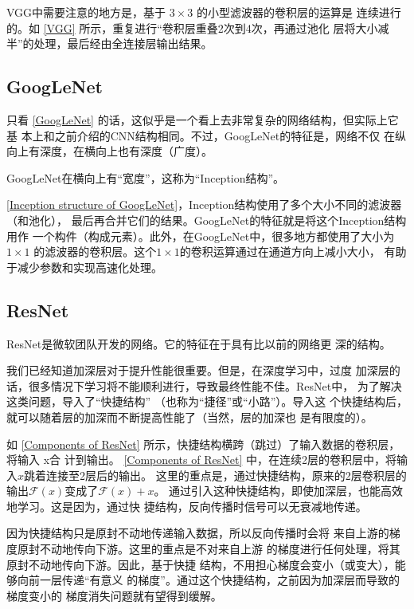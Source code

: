 VGG中需要注意的地方是，基于 $3\times 3$ 的小型滤波器的卷积层的运算是
连续进行的。如 \autoref{VGG} 所示，重复进行“卷积层重叠2次到4次，再通过池化
层将大小减半”的处理，最后经由全连接层输出结果。


\subsection{GoogLeNet}
只看 \autoref{GoogLeNet} 的话，这似乎是一个看上去非常复杂的网络结构，但实际上它基
本上和之前介绍的CNN结构相同。不过，GoogLeNet的特征是，网络不仅
在纵向上有深度，在横向上也有深度（广度）。

GoogLeNet在横向上有“宽度”，这称为“Inception结构”。


\autoref{Inception structure of GoogLeNet}，Inception结构使用了多个大小不同的滤波器（和池化），
最后再合并它们的结果。GoogLeNet的特征就是将这个Inception结构用作
一个构件（构成元素）。此外，在GoogLeNet中，很多地方都使用了大小为 $1 \times 1$ 的滤波器的卷积层。这个$1 \times 1$的卷积运算通过在通道方向上减小大小，
有助于减少参数和实现高速化处理。


\subsection{ResNet}
ResNet是微软团队开发的网络。它的特征在于具有比以前的网络更
深的结构。

我们已经知道加深层对于提升性能很重要。但是，在深度学习中，过度
加深层的话，很多情况下学习将不能顺利进行，导致最终性能不佳。ResNet中，
为了解决这类问题，导入了“快捷结构”
（也称为“捷径”或“小路”）。导入这
个快捷结构后，就可以随着层的加深而不断提高性能了（当然，层的加深也
是有限度的）。

如 \autoref{Components of ResNet} 所示，快捷结构横跨（跳过）了输入数据的卷积层，将输入 x合
计到输出。
\autoref{Components of ResNet} 中，在连续2层的卷积层中，将输入$x$跳着连接至2层后的输出。
这里的重点是，通过快捷结构，原来的2层卷积层的输出$\mathcal{F}(x)$变成了$\mathcal{F}(x) + x$。
通过引入这种快捷结构，即使加深层，也能高效地学习。这是因为，通过快
捷结构，反向传播时信号可以无衰减地传递。


\begin{tcolorbox}
    因为快捷结构只是原封不动地传递输入数据，所以反向传播时会将
    来自上游的梯度原封不动地传向下游。这里的重点是不对来自上游
    的梯度进行任何处理，将其原封不动地传向下游。因此，基于快捷
    结构，不用担心梯度会变小（或变大），能够向前一层传递“有意义
    的梯度”。通过这个快捷结构，之前因为加深层而导致的梯度变小的
    梯度消失问题就有望得到缓解。
\end{tcolorbox}

